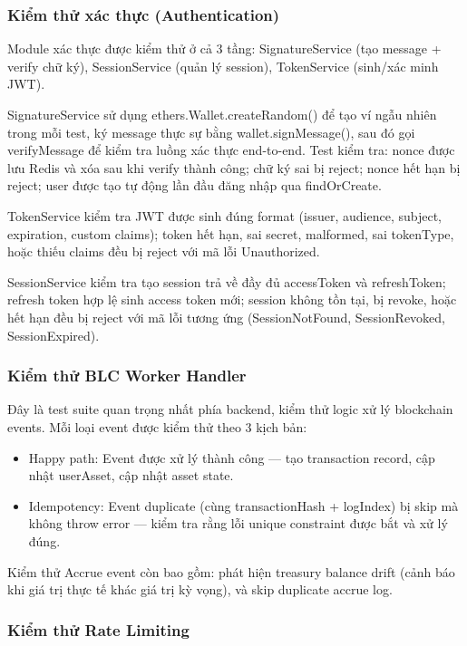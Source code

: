 \documentclass[../DoAn.tex]{subfiles}
\begin{document}
\subsubsection{Kiểm thử xác thực (Authentication)}


Module xác thực được kiểm thử ở cả 3 tầng: SignatureService (tạo message + verify chữ ký), SessionService (quản lý session), TokenService (sinh/xác minh JWT).

SignatureService sử dụng ethers.Wallet.createRandom() để tạo ví ngẫu nhiên trong mỗi test, ký message thực sự bằng wallet.signMessage(), sau đó gọi verifyMessage để kiểm tra luồng xác thực end-to-end. Test kiểm tra: nonce được lưu Redis và xóa sau khi verify thành công; chữ ký sai bị reject; nonce hết hạn bị reject; user được tạo tự động lần đầu đăng nhập qua findOrCreate.

TokenService kiểm tra JWT được sinh đúng format (issuer, audience, subject, expiration, custom claims); token hết hạn, sai secret, malformed, sai tokenType, hoặc thiếu claims đều bị reject với mã lỗi Unauthorized.

SessionService kiểm tra tạo session trả về đầy đủ accessToken và refreshToken; refresh token hợp lệ sinh access token mới; session không tồn tại, bị revoke, hoặc hết hạn đều bị reject với mã lỗi tương ứng (SessionNotFound, SessionRevoked, SessionExpired).

\subsubsection{Kiểm thử BLC Worker Handler}


Đây là test suite quan trọng nhất phía backend, kiểm thử logic xử lý blockchain events. Mỗi loại event được kiểm thử theo 3 kịch bản:

\begin{itemize}
  \item Happy path: Event được xử lý thành công --- tạo transaction record, cập nhật userAsset, cập nhật asset state.
  \item Idempotency: Event duplicate (cùng transactionHash + logIndex) bị skip mà không throw error --- kiểm tra rằng lỗi unique constraint được bắt và xử lý đúng.
\end{itemize}


Kiểm thử Accrue event còn bao gồm: phát hiện treasury balance drift (cảnh báo khi giá trị thực tế khác giá trị kỳ vọng), và skip duplicate accrue log.

\subsubsection{Kiểm thử Rate Limiting}
\end{document}
